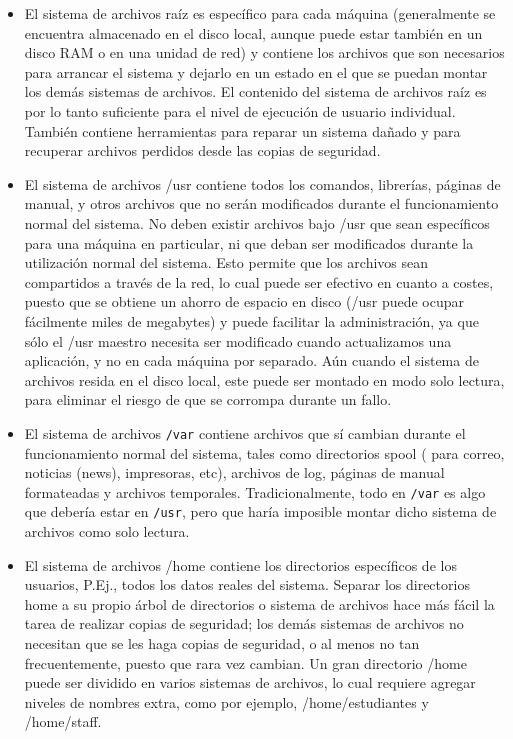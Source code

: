 \begin{itemize} \item{ El sistema de archivos raíz es específico para
cada máquina (generalmente se encuentra almacenado en el disco local, aunque
puede estar también en un disco RAM o en una unidad de red) y contiene los
archivos que son necesarios para arrancar el sistema y dejarlo en un estado en
el que se puedan montar los demás sistemas de archivos. El contenido del sistema
de archivos raíz es por lo tanto suficiente para el nivel de ejecución de
usuario individual. También contiene herramientas para reparar un sistema dañado
y para recuperar archivos perdidos desde las copias de seguridad.
}

\item{ El sistema de archivos /usr contiene todos los comandos,
librerías, páginas de manual, y otros archivos que no serán modificados durante
el funcionamiento normal del sistema. No deben existir archivos bajo /usr que
sean específicos para una máquina en particular, ni que deban ser modificados
durante la utilización normal del sistema. Esto permite que los archivos sean
compartidos a través de la red, lo cual puede ser efectivo en cuanto a costes,
puesto que se obtiene un ahorro de espacio en disco (/usr puede ocupar
fácilmente miles de megabytes) y puede facilitar la administración, ya que sólo
el /usr maestro necesita ser modificado cuando actualizamos una aplicación, y no
en cada máquina por separado. Aún cuando el sistema de archivos resida en el
disco local, este puede ser montado en modo solo lectura, para eliminar el
riesgo de que se corrompa durante un fallo.  }

\item{  El sistema de archivos \texttt{/var} contiene
archivos que sí cambian durante el funcionamiento normal del sistema, tales como
directorios spool ( para correo, noticias (news), impresoras, etc), archivos de
log, páginas de manual formateadas y archivos temporales.  Tradicionalmente,
todo en \texttt{/var} es algo que debería estar en
\texttt{/usr}, pero que haría imposible montar dicho
sistema de archivos como solo lectura. }

\item{ El sistema de archivos /home contiene los directorios
específicos de los usuarios, P.Ej., todos los datos reales del sistema. Separar
los directorios home a su propio árbol de directorios o sistema de archivos hace
más fácil la tarea de realizar copias de seguridad; los demás sistemas de
archivos no necesitan que se les haga copias de seguridad, o al menos no tan
frecuentemente, puesto que  rara vez cambian. Un gran directorio /home puede ser
dividido en varios sistemas de archivos, lo cual requiere agregar niveles de
nombres extra, como por ejemplo, /home/estudiantes y /home/staff.
}


\end{itemize}
